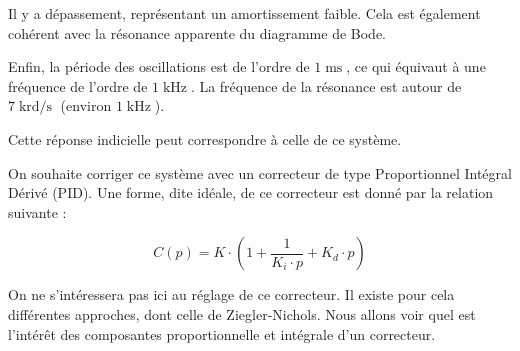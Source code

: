 \begin{enumerate}
{		Il y a dépassement, représentant un amortissement faible. Cela est également cohérent avec la résonance apparente du diagramme de Bode.
		
		Enfin, la période des oscillations est de l'ordre de $1\operatorname{ms}$, ce qui équivaut à une fréquence de l'ordre de $1\operatorname{kHz}$. La fréquence de la résonance est autour de $7\operatorname{krd/s}$ (environ $1\operatorname{kHz}$). 
		
		Cette réponse indicielle peut correspondre à celle de ce système.
	}
	
\end{enumerate}


On souhaite corriger ce système avec un correcteur de type Proportionnel Intégral Dérivé (PID). Une forme, dite idéale, de ce correcteur est donné par la relation suivante :

$$C(p) = K \cdot (1 + \frac{1}{K_i \cdot p} + K_d \cdot p)$$

On ne s'intéressera pas ici au réglage de ce correcteur. Il existe pour cela différentes approches, dont celle de Ziegler-Nichols. Nous allons voir quel est l'intérêt des composantes proportionnelle et intégrale d'un correcteur.

